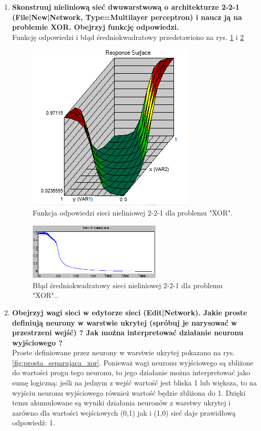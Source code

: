 \begin{enumerate}
\item \textbf{
Skonstruuj nieliniową sieć dwuwarstwową o architekturze 2-2-1 (File|New|Network, Type=Multilayer perceptron) i naucz ją na problemie XOR. Obejrzyj funkcję odpowiedzi.}
\\Funkcję odpowiedzi i błąd średniokwadratowy przedstawiono na rys. \ref{fig:response_221_xor} i \ref{fig:error_221_xor}
\begin{figure}[h]
\centering
\includegraphics[scale=0.75]{dane/part1/zad2/response_221_xor}
\caption{Funkcja odpowiedzi sieci nieliniowej 2-2-1 dla problemu "XOR".\label{fig:response_221_xor}}
\end{figure}

\begin{figure}[h]
\centering
\includegraphics[width=0.6\textwidth]{dane/part1/zad2/error_221_xor}
\caption{Błąd średniokwadratowy sieci nieliniowej 2-2-1 dla problemu "XOR"..\label{fig:error_221_xor}}
\end{figure}


\item \textbf{
Obejrzyj wagi sieci w edytorze sieci (Edit|Network). Jakie proste definiują neurony w warstwie ukrytej (spróbuj je narysować w przestrzeni wejść) ? Jak można interpretować działanie neuronu wyjściowego ?}
\\Proste definiowane przez neurony w warstwie ukrytej pokazano na rys. \ref{fig:prosta_separujaca_xor}. Ponieważ wagi neuronu wyjściowego są zbliżone do wartości progu tego neuronu, to jego działanie można interpretować jako sumę logiczną: jeśli na jednym z wejść wartość jest bliska 1 lub większa, to na wyjściu neuronu wyjściowego również wartość będzie zbliżona do 1. Dzięki temu akumulowane są wyniki działania neuronów z warstwy ukrytej i zarówno dla wartości wejściowych (0,1) jak i (1,0) sieć daje prawidłową odpowiedź: 1.


\end{enumerate}
